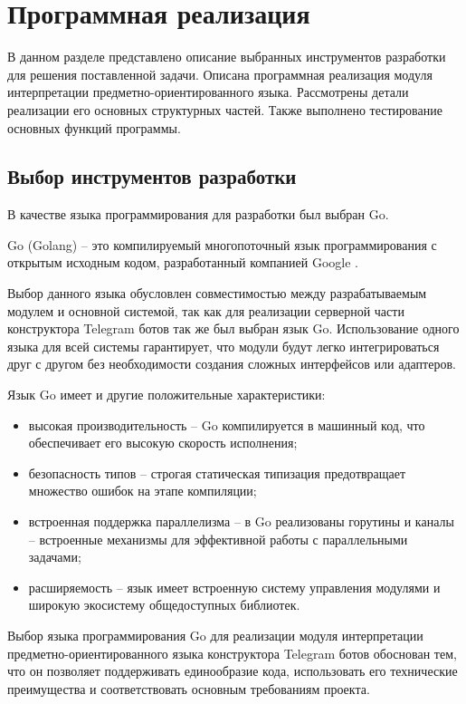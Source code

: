 \newpage

\section{Программная реализация}

В данном разделе представлено описание выбранных инструментов разработки для решения поставленной задачи. 
Описана программная реализация модуля интерпретации предметно-ориентированного языка.
Рассмотрены детали реализации его основных структурных частей.
Также выполнено тестирование основных функций программы.

\subsection{Выбор инструментов разработки}

В качестве языка программирования для разработки был выбран Go.

Go (Golang) -- это компилируемый многопоточный язык программирования с открытым исходным кодом, разработанный компанией Google .

Выбор данного языка обусловлен совместимостью между разрабатываемым модулем и основной системой,
так как для реализации серверной части конструктора Telegram ботов так же был выбран язык Go.
Использование одного языка для всей системы гарантирует,
что модули будут легко интегрироваться друг с другом без необходимости создания сложных интерфейсов или адаптеров.

Язык Go имеет и другие положительные характеристики:
\begin{itemize}
    \item высокая производительность -- Go компилируется в машинный код, что обеспечивает его высокую скорость исполнения;
    \item безопасность типов -- строгая статическая типизация предотвращает множество ошибок на этапе компиляции;
    \item встроенная поддержка параллелизма -- в Go реализованы горутины и каналы -- встроенные механизмы для эффективной работы с параллельными задачами;
    \item расширяемость -- язык имеет встроенную систему управления модулями и широкую экосистему общедоступных библиотек.
\end{itemize}

Выбор языка программирования Go для реализации модуля интерпретации предметно-ориентированного языка конструктора Telegram ботов обоснован тем,
что он позволяет поддерживать единообразие кода, использовать его технические преимущества и соответствовать основным требованиям проекта.

